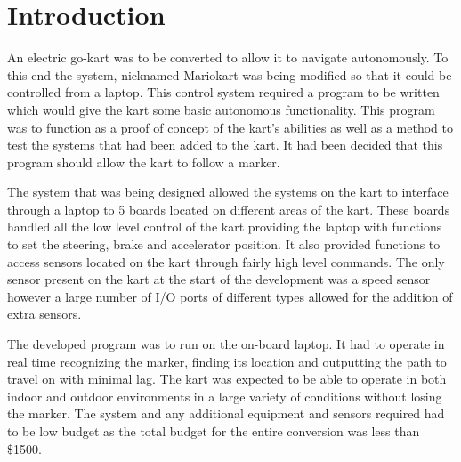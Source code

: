 \section{Introduction}

An electric go-kart was to be converted to allow it to navigate autonomously. To this end the system, nicknamed Mariokart was being modified so that it could be controlled from a laptop. This control system required a program to be written which would give the kart some basic autonomous functionality. This program was to function as a proof of concept of the kart's abilities as well as a method to test the systems that had been added to the kart. It had been decided that this program should allow the kart to follow a marker. 

The system that was being designed allowed the systems on the kart to interface through a laptop to 5 boards located on different areas of the kart. These boards handled all the low level control of the kart providing the laptop with functions to set the steering, brake and accelerator position. It also provided functions to access sensors located on the kart through fairly high level commands. The only sensor present on the kart at the start of the development was a speed sensor however a large number of I/O ports of different types allowed for the addition of extra sensors.  

The developed program was to run on the on-board laptop. It had to operate in real time recognizing the marker, finding its location and outputting the path to travel on with minimal lag. The kart was expected to be able to operate in both indoor and outdoor environments in a large variety of conditions without losing the marker. The system and any additional equipment and sensors required had to be low budget as the total budget for the entire conversion was less than \$1500.
